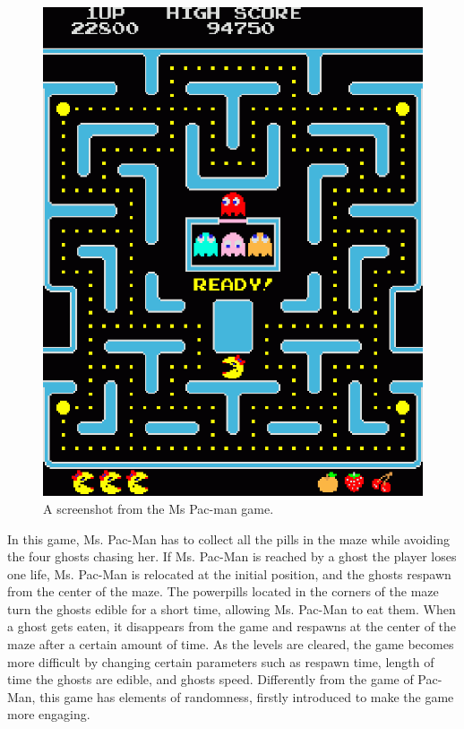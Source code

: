 \documentclass{llncs}
\begin{document}
\begin{figure}
\begin{center}
\includegraphics[scale=0.8]{img/mspacman.eps}
\caption{A screenshot from the Ms Pac-man game.
\label{fig:mspacman_game_snap}}
\end{center}
\end{figure}

In this game, Ms. Pac-Man has to collect all the pills in the maze while avoiding the four ghosts chasing her. If Ms. Pac-Man is reached by a ghost the player loses one life, Ms. Pac-Man is relocated at the initial position, and the ghosts respawn from the center of the maze. The powerpills located in the corners of the maze turn the ghosts edible for a short time, allowing Ms. Pac-Man to eat them. When a ghost gets eaten, it disappears from the game and respawns at the center of the maze after a certain amount of time. As the levels are cleared, the game becomes more difficult by changing certain parameters such as respawn time, length of time the ghosts are edible, and ghosts speed. Differently from the game of Pac-Man, this game has elements of randomness, firstly introduced to make the game more engaging.
\end{document}
